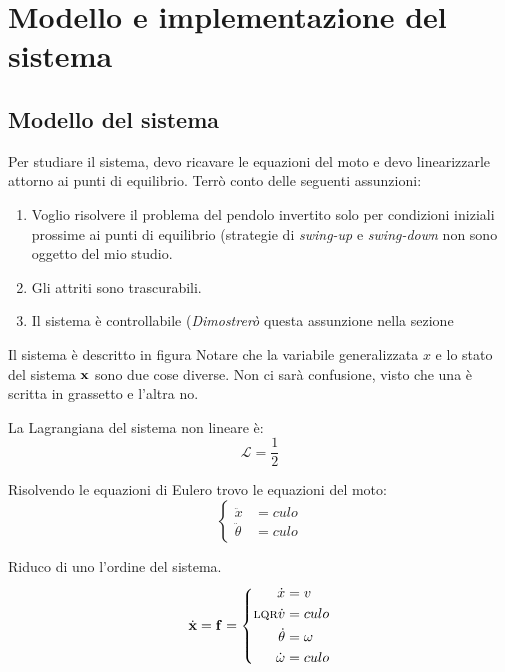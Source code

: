 \section{Modello e implementazione del sistema}\label{sec:modello}
\subsection{Modello del sistema}\label{subsec:modello-del-sistema}
Per studiare il sistema, devo ricavare le equazioni del moto e devo linearizzarle attorno ai punti di equilibrio.
Terrò conto delle seguenti assunzioni:

\begin{enumerate}
  \item%
  Voglio risolvere il problema del pendolo invertito solo per condizioni iniziali prossime ai punti di equilibrio
  (strategie di \emph{swing-up} e \emph{swing-down} non sono oggetto del mio studio.
  \item%
  Gli attriti sono trascurabili.
  \item%
  Il sistema è controllabile (\emph{Dimostrerò} questa assunzione nella sezione %
\end{enumerate}

Il sistema è descritto in figura %
Notare che la variabile generalizzata $x$ e lo stato del sistema $\bf x$ sono due cose diverse. Non ci sarà confusione,
visto che una è scritta in grassetto e l'altra no.

La Lagrangiana del sistema non lineare è:
\begin{equation}
  \mathcal L = \frac 1 2
  \label{eq:lagrangiana}
\end{equation}

Risolvendo le equazioni di Eulero trovo le equazioni del moto:
\begin{equation}
  \left\{
    \begin{aligned}
      \ddot x &= culo \\
      \ddot \theta &= culo
    \end{aligned}
  \right.
  \label{eq:eq-moto}
\end{equation}

Riduco di uno l'ordine del sistema.
\begin{equation}
  \dot {\bf x} = \bf f =
  \left\{
    \begin{aligned}
      \dot x &= v \\\textsc{lqr}
      \dot v &= culo \\
      \dot \theta &= \omega \\
      \dot \omega &= culo
    \end{aligned}
  \right.
  \label{eq:eq-1-grado}
\end{equation}

